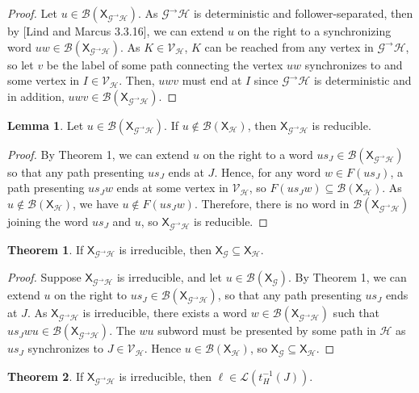 \documentclass{article}
\newcommand{\Lc}{\mathcal{L}}  %
\newcommand{\Gc}{\mathcal{G}}  %
\newcommand{\Hc}{\mathcal{H}}  %
\newcommand{\Vc}{\mathcal{V}}
\newcommand{\Bc}{\mathcal{B}}
\newcommand{\GtH}{\Gc^\to\Hc}
\newcommand{\shift}[1]{\mathsf{X}_{#1}}
\theoremstyle{definition}
\newtheorem{theorem}{Theorem}
\newtheorem{lemma}{Lemma}
\begin{document}
\begin{proof}
    Let \(u \in \Bc(\shift{\GtH})\). As \(\GtH\) is deterministic and 
    follower-separated, then by [Lind and Marcus 3.3.16], we can 
    extend \(u\) on the right to a synchronizing word \(uw \in \Bc(\shift{\GtH})\).
    As \(K \in \Vc_\Hc\), \(K\) can be reached from any vertex in \(\GtH\), so 
    let \(v\) be the label of some path connecting the vertex \(uw\) synchronizes to 
    and some vertex in \(I \in \Vc_\Hc\). Then, \(uwv\) must end at \(I\) since 
    \(\GtH\) is deterministic and in addition, \(uwv \in \Bc(\shift{\GtH})\).
\end{proof}

\begin{lemma}
    Let \(u \in \Bc(\shift{\GtH})\). If \(u \notin \Bc(\shift{\Hc})\), then \(\shift{\GtH}\) is 
    reducible.
\end{lemma}

\begin{proof}
    By Theorem 1, we can extend \(u\) on the right to a word \(us_J \in \Bc(\shift{\GtH})\)
    so that any path presenting \(us_J\) ends at \(J\). Hence, for any word \(w \in F(us_J)\), a 
    path presenting \(us_Jw\) ends at some vertex in \(\Vc_\Hc\), so \(F(us_Jw) \subseteq \Bc(\shift{\Hc})\). 
    As \(u \notin \Bc(\shift{\Hc})\), we have \(u \notin F(us_Jw)\). Therefore, there is no word in 
    \(\Bc(\shift{\GtH})\) joining the word \(us_J\) and \(u\), so \(\shift{\GtH} \) is reducible.
\end{proof}

\begin{theorem}
    If \(\shift{\GtH}\) is irreducible, then \(\shift{\Gc} \subseteq \shift{\Hc}\).
\end{theorem}

\begin{proof}
    Suppose \(\shift{\GtH}\) is irreducible, and let \(u \in \Bc(\shift{\Gc})\). By Theorem 1, we can extend 
    \(u\) on the right to \(u s_J \in \Bc(\shift{\GtH})\), so that any 
    path presenting \(u s_J\) ends at \(J\). As \(\shift{\GtH}\) is irreducible,
    there exists a word \(w \in \Bc(\shift{\GtH})\) such that \(u s_J w u \in \Bc(\shift{\GtH})\).
    The \(wu\) subword must be presented by some path in \(\Hc\) as \(u s_J\) 
    synchronizes to \(J \in \Vc_\Hc\). Hence \(u \in \Bc(\shift{\Hc})\), so \(\shift{\Gc} \subseteq \shift{\Hc}\).
\end{proof}

\begin{theorem}
    If \(\shift{\GtH}\) is irreducible, then \(\ell \in \Lc(t^{-1}_H(J))\).
\end{theorem}
\end{document}
